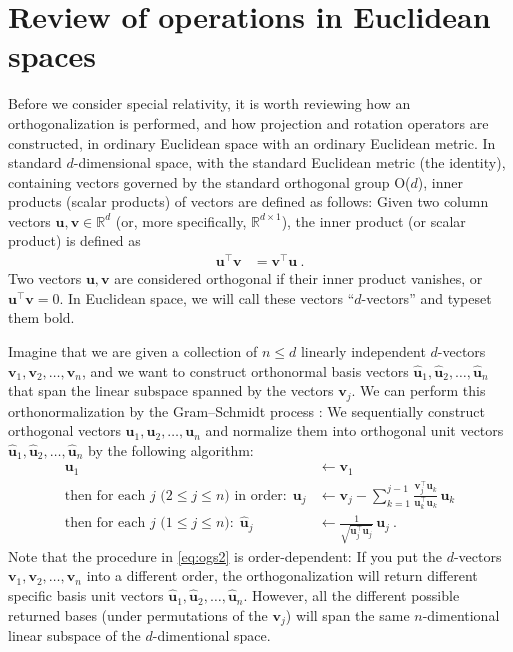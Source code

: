 \documentclass{article}
\newcommand{\Evec}[1]{{\mathbf{#1}}} %
\newcommand{\Ehat}[1]{{\mathbf{\hat{#1}}}} %
\begin{document}
\section{Review of operations in Euclidean spaces}\label{sec:od}

Before we consider special relativity, it is worth reviewing how an orthogonalization is performed, and how projection and rotation operators are constructed, in ordinary Euclidean space with an ordinary Euclidean metric.
In standard $d$-dimensional space, with the standard Euclidean metric (the identity), containing vectors governed by the standard orthogonal group O($d$), inner products (scalar products) of vectors are defined as follows:
Given two column vectors $\Evec{u},\Evec{v}\in\mathbb{R}^d$ (or, more specifically, $\mathbb{R}^{d\times1}$), the inner product (or scalar product) is defined as
\begin{align}
    \Evec{u}^\top \Evec{v} &= \Evec{v}^\top \Evec{u} ~.
\end{align}
Two vectors $\Evec{u},\Evec{v}$ are considered orthogonal if their inner product vanishes, or $\Evec{u}^\top\Evec{v}=0$.
In Euclidean space, we will call these vectors ``$d$-vectors'' and typeset them bold.

Imagine that we are given a collection of $n\leq d$ linearly independent $d$-vectors $\Evec{v}_1,\Evec{v}_2,\ldots,\Evec{v}_n$,
and we want to construct orthonormal basis vectors $\Ehat{u}_1,\Ehat{u}_2,\ldots,\Ehat{u}_n$ that span the linear subspace spanned by the vectors $\Evec{v}_j$.
We can perform this orthonormalization by the Gram--Schmidt process \cite{gramschmidt}:
We sequentially construct orthogonal vectors $\Evec{u}_1,\Evec{u}_2,\ldots,\Evec{u}_n$ and normalize them into orthogonal unit vectors $\Ehat{u}_1,\Ehat{u}_2,\ldots,\Ehat{u}_n$ by the following algorithm:
\begin{align}
    \Evec{u}_1 &\leftarrow \Evec{v}_1 \label{eq:ogs1}
    \\
    \mbox{then for each $j$ ($2\leq j\leq n$) in order:} ~~ \Evec{u}_j &\leftarrow \Evec{v}_j - \sum_{k=1}^{j-1} \frac{\Evec{v}_j^\top\Evec{u}_k}{\Evec{u}_k^\top\Evec{u}_k}\,\Evec{u}_k \label{eq:ogs2}
    \\
    \mbox{then for each $j$ ($1\leq j\leq n$):} ~~ \Ehat{u}_j &\leftarrow \frac{1}{\sqrt{\Evec{u}_j^\top\Evec{u}_j}}\,\Evec{u}_j ~. \label{eq:ogs3}
\end{align}
Note that the procedure in \eqref{eq:ogs2} is order-dependent: If you put the $d$-vectors $\Evec{v}_1,\Evec{v}_2,\ldots,\Evec{v}_n$ into a different order, the orthogonalization will return different specific basis unit vectors $\Ehat{u}_1,\Ehat{u}_2,\ldots,\Ehat{u}_n$.
However, all the different possible returned bases (under permutations of the $\Evec{v}_j$) will span the same $n$-dimentional linear subspace of the $d$-dimentional space.
\end{document}
